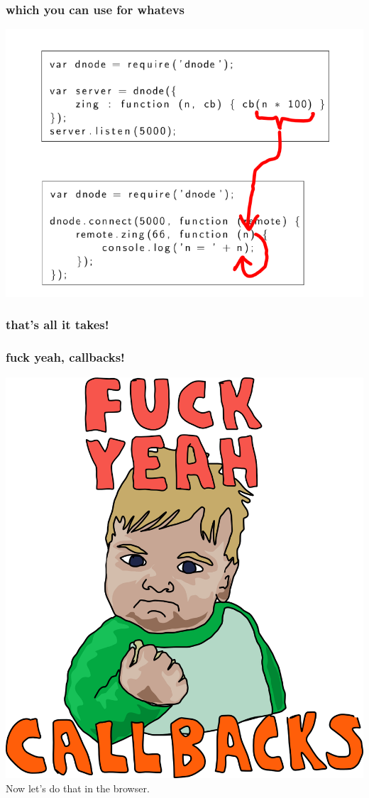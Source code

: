 \documentclass{beamer}
\begin{document}
\begin{frame}
    \frametitle{which you can use for whatevs}
    \includegraphics[scale=0.6]{images/zing_flow_6.png}
\end{frame}

\begin{frame}
    \frametitle{that's all it takes!}
    \begin{center}
        \fbox{}
    \end{center}
\end{frame}

\begin{frame}
    \frametitle{fuck yeah, callbacks!}
    \begin{center}
        \includegraphics[scale=0.4]{images/fuck_yeah.png}
        \newline
        \pause
        \huge
        Now let's do that in the browser.
    \end{center}
\end{frame}
\end{document}

